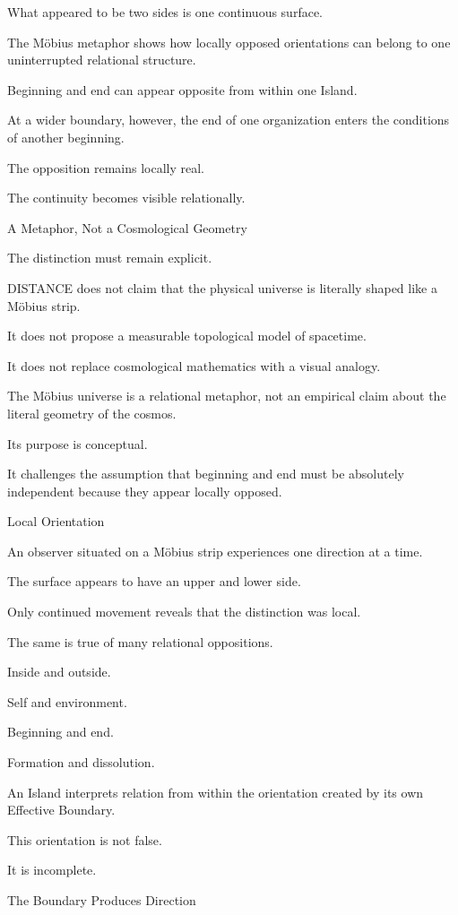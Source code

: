 What appeared to be two sides is one continuous surface.

The Möbius metaphor shows how locally opposed orientations can belong to one uninterrupted relational structure.

Beginning and end can appear opposite from within one Island.

At a wider boundary, however, the end of one organization enters the conditions of another beginning.

The opposition remains locally real.

The continuity becomes visible relationally.

A Metaphor, Not a Cosmological Geometry

The distinction must remain explicit.

DISTANCE does not claim that the physical universe is literally shaped like a Möbius strip.

It does not propose a measurable topological model of spacetime.

It does not replace cosmological mathematics with a visual analogy.

The Möbius universe is a relational metaphor, not an empirical claim about the literal geometry of the cosmos.

Its purpose is conceptual.

It challenges the assumption that beginning and end must be absolutely independent because they appear locally opposed.

Local Orientation

An observer situated on a Möbius strip experiences one direction at a time.

The surface appears to have an upper and lower side.

Only continued movement reveals that the distinction was local.

The same is true of many relational oppositions.

Inside and outside.

Self and environment.

Beginning and end.

Formation and dissolution.

An Island interprets relation from within the orientation created by its own Effective Boundary.

This orientation is not false.

It is incomplete.

The Boundary Produces Direction

